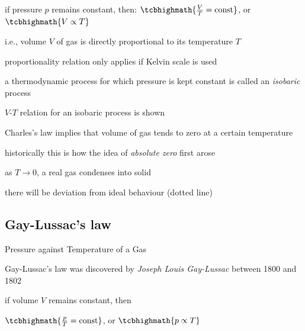 if pressure $p$ remains constant, then: $\tcbhighmath{\frac{V}{T}=\text{const}}$, or $\tcbhighmath{V \propto T}$

i.e., volume $V$ of gas is directly proportional to its temperature $T$

\cmt proportionality relation only applies if Kelvin scale is used

\cmt a thermodynamic process for which pressure is kept constant is called an \emph{isobaric} process

$V$-$T$ relation for an isobaric process is shown

\cmt Charles's law implies that volume of gas tends to zero at a certain temperature

historically this is how the idea of \emph{absolute zero} first arose

\cmt as $T\to0$, a real gas condenses into solid

there will be deviation from ideal behaviour (dotted line)



\subsection*{Gay-Lussac's law}

\begin{marginfigure}
		\caption{Pressure against Temperature of a Gas}
\end{marginfigure}

Gay-Lussac's law was discovered by \emph{Joseph Louis Gay-Lussac} between 1800 and 1802


if volume $V$ remains constant, then

{
	
	\centering
	
	$\tcbhighmath{\frac{p}{T}=\text{const}}$, or $\tcbhighmath{p \propto T}$
	
} 

